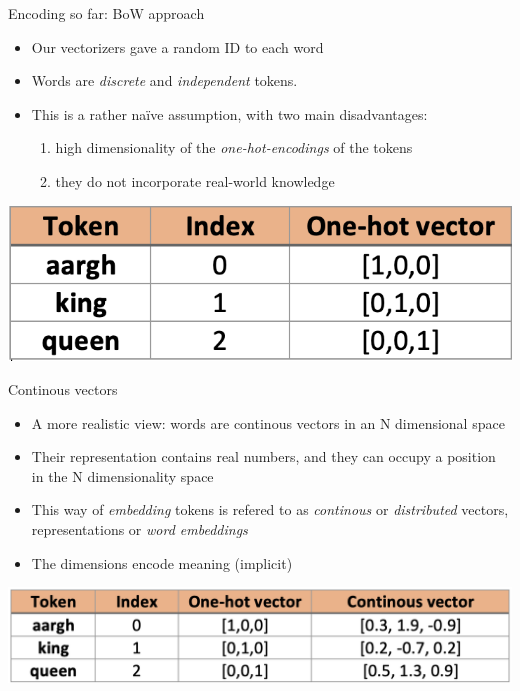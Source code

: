 \documentclass[compress]{beamer}
\begin{document}
\begin{frame}{Encoding so far: BoW approach}
	\begin{itemize}
		\item Our vectorizers gave a random ID to each word
		\item Words are \emph{discrete} and \emph{independent} tokens.
		\item This is a rather naïve assumption, with two main disadvantages:
\begin{enumerate}
	\item high dimensionality of the \emph{one-hot-encodings} of the tokens
	\item they do not incorporate real-world knowledge
\end{enumerate}
	\end{itemize}

\begin{center}
\includegraphics[scale=0.5]{bow.png}
\end{center}
\end{frame}

\begin{frame}{Continous vectors}
	\begin{itemize}
		\item A more realistic view: words are continous vectors in an N dimensional space
		\item Their representation contains real numbers, and they can occupy a position in the N dimensionality space
		\item This way of \emph{embedding} tokens is refered to as \emph{continous} or \emph{distributed} vectors, representations or \emph{word embeddings}
		\item The dimensions encode meaning (implicit)
		\end{itemize}
\end{frame}

\begin{frame}
\begin{center}
	\includegraphics[scale=0.5]{bow_continous.png}
\end{center}
\end{frame}
\end{document}
